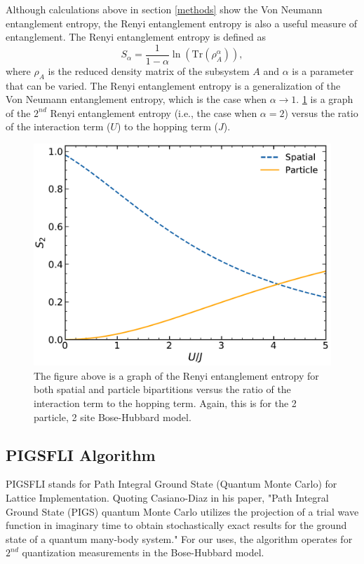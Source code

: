 Although calculations above in section \ref{methods} show the Von Neumann entanglement entropy, the Renyi entanglement entropy is also a useful measure of entanglement. The Renyi entanglement entropy is defined as 
\begin{equation}
S_{\alpha} = \frac{1}{1-\alpha} \ln{\left( \text{Tr} \left( \rho_A^{\alpha} \right) \right)},
\end{equation}
where $\rho_A$ is the reduced density matrix of the subsystem $A$ and $\alpha$ is a parameter that can be varied. The Renyi entanglement entropy is a generalization of the Von Neumann entanglement entropy, which is the case when $\alpha \rightarrow 1$.\cite{wang_entanglement_2016} \cref*{fig:ed_renyi} is a graph of the $2^{nd}$ Renyi entanglement entropy (i.e., the case when $\alpha = 2$) versus the ratio of the interaction term ($U$) to the hopping term ($J$).

\begin{figure}[H]
\centering
\includegraphics[scale=0.5]{../figures/ed_renyi.pdf}
\caption{The figure above is a graph of the Renyi entanglement entropy for both spatial and particle bipartitions versus the ratio of the interaction term to the hopping term. Again, this is for the 2 particle, 2 site Bose-Hubbard model.}
\label{fig:ed_renyi}
\end{figure}

\subsection{PIGSFLI Algorithm} \label{PIGSFLI}
PIGSFLI stands for Path Integral Ground State (Quantum Monte Carlo) for Lattice Implementation. Quoting Casiano-Diaz in his paper, "Path Integral Ground State (PIGS) quantum Monte Carlo utilizes the projection of a trial wave function in imaginary time to obtain stochastically exact results for the ground state of a quantum many-body system."\cite{emanuel_pigsfli_2022} For our uses, the algorithm operates for $2^{nd}$ quantization measurements in the Bose-Hubbard model.

